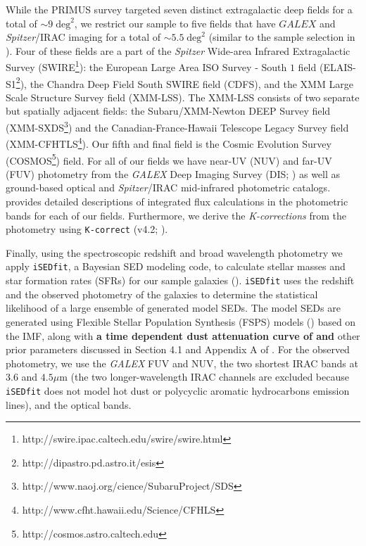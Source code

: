 \documentclass{emulateapj}
\begin{document}
While the PRIMUS survey targeted seven distinct extragalactic deep fields for a total of $\sim 9 \; \mathrm{deg}^2$, we restrict our sample to five fields that have $GALEX$ and {\em Spitzer}/IRAC imaging for a total of $\sim 5.5 \; \mathrm{deg}^2$ (similar to the sample selection in \citealt{Moustakas:2013aa}). Four of these fields are a part of the {\em Spitzer} Wide-area Infrared Extragalactic Survey (SWIRE\footnote{http://swire.ipac.caltech.edu/swire/swire.html}): the European Large Area ISO Survey - South $1$ field (ELAIS-S1\footnote{http://dipastro.pd.astro.it/esis}), the Chandra Deep Field South SWIRE field (CDFS), and the XMM Large Scale Structure Survey field (XMM-LSS). The XMM-LSS consists of two separate but spatially adjacent fields: the Subaru/XMM-Newton DEEP Survey field (XMM-SXDS\footnote{http://www.naoj.org/cience/SubaruProject/SDS}) and the Canadian-France-Hawaii Telescope Legacy Survey field (XMM-CFHTLS\footnote{http://www.cfht.hawaii.edu/Science/CFHLS}). Our fifth and final field is the Cosmic Evolution Survey (COSMOS\footnote{http://cosmos.astro.caltech.edu}) field. For all of our fields we have near-UV (NUV) and far-UV (FUV) photometry from the {\em GALEX} Deep Imaging Survey (DIS; \citealt{Martin:2005aa, Morrissey:2005aa}) as well as ground-based optical and {\em Spitzer}/IRAC mid-infrared photometric catalogs. \cite{Moustakas:2013aa} provides detailed descriptions of integrated flux calculations in the photometric bands for each of our fields. Furthermore, we derive the {\em K-corrections} from the photometry using \texttt{K-correct} (v4.2; \citealt{Blanton:2007aa}). 

Finally, using the spectroscopic redshift and broad wavelength photometry we apply \texttt{iSEDfit}, a Bayesian SED modeling code, to calculate stellar masses and star formation rates (SFRs) for our sample galaxies (\citealt{Moustakas:2013aa}). \texttt{iSEDfit} uses the redshift and the observed photometry of the galaxies to determine the statistical likelihood of a large ensemble of generated model SEDs. The model SEDs are generated using Flexible Stellar Population Synthesis (FSPS) models (\citealt{Conroy:2010aa}) based on the \cite{Chabrier:2003aa} IMF, along with {\bf a time dependent dust attenuation curve of \cite{Charlot:2000aa} and }other prior parameters discussed in Section 4.1 and Appendix A of \cite{Moustakas:2013aa}. For the observed photometry, we use the {\em GALEX} FUV and NUV, the two shortest IRAC bands at $3.6$ and $4.5 \mu \mathrm{m}$ (the two longer-wavelength IRAC channels are excluded because \texttt{iSEDfit} does not model hot dust or polycyclic aromatic hydrocarbons emission lines), and the optical bands. 
\end{document}
